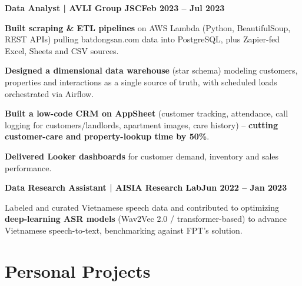 \documentclass[letterpaper,10pt]{article}
\newcommand{\heading}[2]{
  \hspace{10pt}#1\hfill#2\\
}
\newcommand{\headingBf}[2]{
  \heading{\textbf{#1}}{\textbf{#2}}
}
\newenvironment{resume_list}{
  \vspace{-2pt}
  \begin{itemize}[topsep=2pt, itemsep=1pt, parsep=0pt, leftmargin=30pt, label=\textbullet]
}{
  \end{itemize}
}
\begin{document}
\vspace{6pt}

\headingBf{Data Analyst | AVLI Group JSC}{Feb 2023 -- Jul 2023}
\vspace{1pt}
\begin{resume_list}
  \item \textbf{Built scraping \& ETL pipelines} on AWS Lambda (Python, BeautifulSoup, REST APIs) pulling batdongsan.com data into PostgreSQL, plus Zapier-fed Excel, Sheets and CSV sources.
  \item \textbf{Designed a dimensional data warehouse} (star schema) modeling customers, properties and interactions as a single source of truth, with scheduled loads orchestrated via Airflow.
  \item \textbf{Built a low-code CRM on AppSheet} (customer tracking, attendance, call logging for customers/landlords, apartment images, care history) -- \textbf{cutting customer-care and property-lookup time by 50\%}.
  \item \textbf{Delivered Looker dashboards} for customer demand, inventory and sales performance.
\end{resume_list}

\vspace{0pt}

\headingBf{Data Research Assistant | AISIA Research Lab}{Jun 2022 -- Jan 2023}
\vspace{1pt}
\begin{resume_list}
  \item Labeled and curated Vietnamese speech data and contributed to optimizing \textbf{deep-learning ASR models} (Wav2Vec 2.0 / transformer-based) to advance Vietnamese speech-to-text, benchmarking against FPT's solution.
\end{resume_list}



\newpage


\section{Personal Projects}

\end{document}
